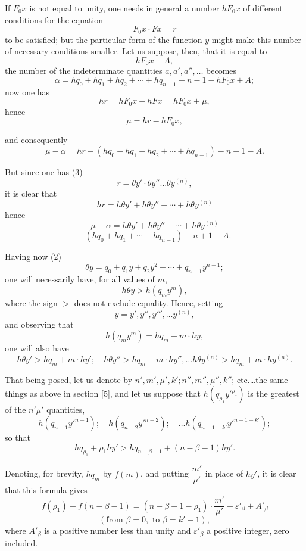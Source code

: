 \documentclass{article}
\begin{document}
If $F_0 x$ is not equal to unity, one needs in general a number $hF_0 x$ of different conditions for the equation
\[ F_0 x \cdot F x = r \]
to be satisfied; but the particular form of the function $y$ might make this number of necessary conditions smaller. Let us suppose, then, that it is equal to
\[ hF_0 x - A, \tag{75} \]
the number of the indeterminate quantities $a, a', a'', \ldots$ becomes
\[ \alpha = hq_0 + hq_1 + hq_2 + \cdots + hq_{n-1} + n - 1 - hF_0 x + A; \tag{76} \]
now one has
\[ hr = hF_0 x + hF x = hF_0 x + \mu, \]
hence
\[ \mu = hr - hF_0 x, \tag{77} \]

and consequently
\[ \mu - \alpha = hr - (hq_0 + hq_1 + hq_2 + \cdots + hq_{n-1}) - n + 1 - A. \tag{78} \]

But since one has (3)
\[ r = \theta y' \cdot \theta y'' \ldots \theta y^{(n)}, \]
it is clear that
\[ hr = h\theta y' + h\theta y'' + \cdots + h\theta y^{(n)} \tag{79} \]
hence
\[ \mu - \alpha = h\theta y' + h\theta y'' + \cdots + h\theta y^{(n)} \]
\[ - (hq_0 + hq_1 + \cdots + hq_{n-1}) - n + 1 - A. \tag{80} \]

Having now (2)
\[ \theta y = q_0 + q_1 y + q_2 y^{2} + \cdots + q_{n-1} y^{n-1}; \]
one will necessarily have, for all values of $m$,
\[ h\theta y > h(q_m y^{m}), \]
where the sign $>$ does not exclude equality.
Hence, setting
\[ y = y', y'', y''', \ldots y^{(n)}, \]
and observing that
\[ h(q_m y^{m}) = hq_m + m \cdot hy, \]
one will also have
\[ h\theta y' > hq_m + m \cdot hy'; \quad h\theta y'' > hq_m + m \cdot hy'', \ldots h\theta y^{(n)} > hq_m + m \cdot hy^{(n)}. \tag{81} \]

That being posed, let us denote by $n', m', \mu', k'; n'', m'', \mu'', k''$; etc.\ldots the same things as above in section [5], and let us suppose that $h(q_{\rho_1} y'^{\rho_1})$ is the greatest of the $n'\mu'$ quantities,
\[ h(q_{n-1} y'^{n-1}); \quad h(q_{n-2} y'^{n-2}); \quad \ldots h(q_{n-1-k'} y'^{n-1-k'}); \]
so that
\[ hq_{\rho_1} + \rho_1 hy' > hq_{n-\beta-1} + (n-\beta-1)hy'. \tag{82} \]

Denoting, for brevity, $hq_m$ by $f(m)$, and putting $\dfrac{m'}{\mu'}$ in place of $hy'$, it is clear that this formula gives
\[ f(\rho_1) - f(n-\beta-1) = (n-\beta-1-\rho_1) \cdot \frac{m'}{\mu'} + \varepsilon'_\beta + A'_\beta \]
\[ (\text{from } \beta = 0, \text{ to } \beta = k'-1), \]
where $A'_\beta$ is a positive number less than unity and $\varepsilon'_\beta$ a positive integer, zero included.
\end{document}
